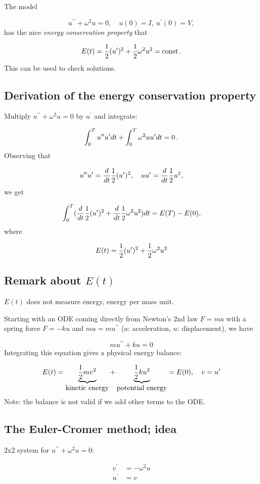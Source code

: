 \documentclass[%
oneside,                 %
final,                   %
10pt]{article}
\begin{document}
The model

\[ u^{\prime\prime} + \omega^2 u = 0,\quad u(0)=I,\ u^{\prime}(0)=V,\]
has the nice \emph{energy conservation property} that

\[ E(t) = \half(u^{\prime})^2 + \half\omega^2u^2 = \hbox{const}\tp\]
This can be used to check solutions.

\subsection*{Derivation of the energy conservation property}

Multiply $u^{\prime\prime}+\omega^2u=0$ by $u^{\prime}$ and integrate:

\[ \int_0^T u^{\prime\prime}u^{\prime} dt + \int_0^T\omega^2 u u^{\prime} dt = 0\tp\]
Observing that

\[ u^{\prime\prime}u^{\prime} = \frac{d}{dt}\half(u^{\prime})^2,\quad uu^{\prime} = \frac{d}{dt} {\half}u^2,\]
we get

\[
\int_0^T (\frac{d}{dt}\half(u^{\prime})^2 + \frac{d}{dt} \half\omega^2u^2)dt = E(T) - E(0),
\]
where

\[
E(t) = \half(u^{\prime})^2 + \half\omega^2u^2
\]

\subsection*{Remark about $E(t)$}

$E(t)$ does not measure energy, energy per mass unit.

Starting with an ODE coming directly from Newton's 2nd law $F=ma$ with
a spring force $F=-ku$ and $ma=mu^{\prime\prime}$ ($a$: acceleration, $u$: displacement),
we have

\[ mu^{\prime\prime} + ku = 0\]
Integrating this equation gives a physical energy balance:

\[
E(t) = \underbrace{{\half}mv^2}_{\hbox{kinetic energy} }
+ \underbrace{{\half}ku^2}_{\hbox{potential energy}} = E(0),\quad v=u^{\prime}
\]
Note: the balance is not valid if we add other terms to the ODE.


\subsection*{The Euler-Cromer method; idea}
\label{vib:model2x2:EulerCromer}

2x2 system for $u^{\prime\prime}+\omega^2u=0$:

\begin{align*}
v^{\prime} &= -\omega^2u\\ 
u^{\prime} &= v
\end{align*}
\end{document}
